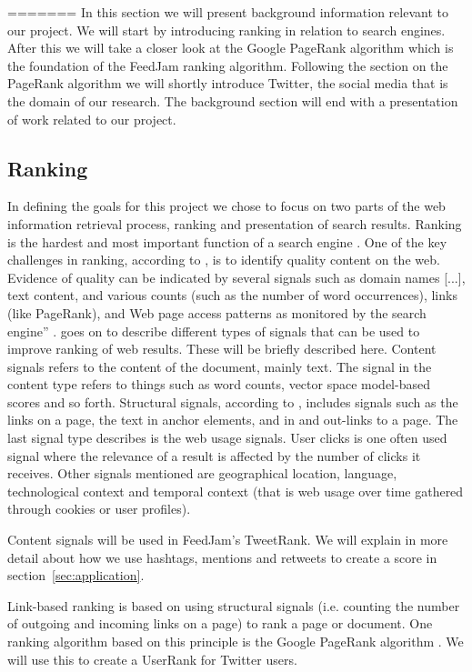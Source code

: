 
=======
In this section we will present background information relevant to our project. We will start by introducing ranking in relation to search engines. After this we will take a closer look at the Google PageRank algorithm which is the foundation of the FeedJam ranking algorithm.  Following the section on the PageRank algorithm we will shortly introduce Twitter, the social media that is the domain of our research. The background section will end with a presentation of work related to our project.

\subsection{Ranking} 
In defining the goals for this project we chose to focus on two parts of the web information retrieval process, ranking and presentation of search results. Ranking is the hardest and most important function of a search engine \cite[p.469]{Baeza-Yates2011}. One of the key challenges in ranking, according to \citet{Baeza-Yates2011}, is to identify quality content on the web. Evidence of quality can be indicated by several signals such as domain names [...], text content, and various counts (such as the number of word occurrences), links (like PageRank), and Web page access patterns as monitored by the search engine” \citep[p.468]{Baeza-Yates2011}. \citet{Baeza-Yates2011} goes on to describe different types of signals that can be used to improve ranking of web results. These will be briefly described here. Content signals refers to the content of the document, mainly text. The signal in the content type refers to things such as word counts, vector space model-based scores and so forth. Structural signals, according to \citet{Baeza-Yates2011}, includes signals such as the links on a page, the text in anchor elements, and in and out-links to a page.  The last signal type describes is the web usage signals. User clicks is one often used signal where the relevance of a result is affected by the number of clicks it receives. Other signals mentioned are geographical location, language, technological context and temporal context (that is web usage over time gathered through cookies or user profiles)\citep{Baeza-Yates2011}.

Content signals will be used in FeedJam's TweetRank. We will explain in more detail about how we use hashtags, mentions and retweets to create a score in section~\ref{sec:application}.

Link-based ranking is based on using structural signals (i.e. counting the number of outgoing and incoming links on a page) to rank a page or document. One ranking algorithm based on this  principle is the Google PageRank algorithm \citep{Page1999}. We will use this to create a UserRank for Twitter users. 

